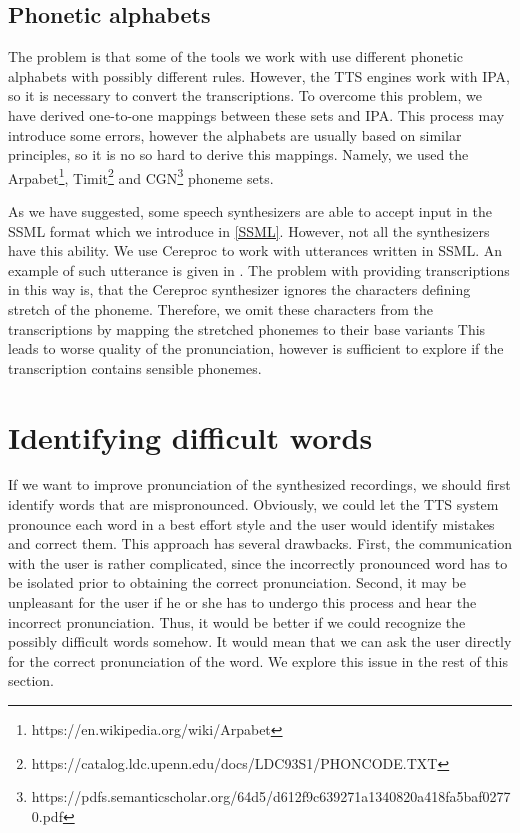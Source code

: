 \subsection{Phonetic alphabets}
\par
The problem is that some of the tools we work with use different phonetic alphabets with possibly different rules.
However, the TTS engines work with IPA, so it is necessary to convert the transcriptions.
To overcome this problem, we have derived one-to-one mappings between these sets and IPA.
This process may introduce some errors, however the alphabets are usually based on similar principles, so it is no so hard to derive this mappings.
Namely, we used the Arpabet\footnote{https://en.wikipedia.org/wiki/Arpabet}, Timit\footnote{https://catalog.ldc.upenn.edu/docs/LDC93S1/PHONCODE.TXT} and CGN\footnote{https://pdfs.semanticscholar.org/64d5/d612f9c639271a1340820a418fa5baf02770.pdf} phoneme sets.
\par
As we have suggested, some speech synthesizers are able to accept input in the SSML format which we introduce in \ref{SSML}.
However, not all the synthesizers have this ability.
We use Cereproc to work with utterances written in SSML.
An example of such utterance is given in .
The problem with providing transcriptions in this way is, that the Cereproc synthesizer ignores the characters defining stretch of the phoneme.
Therefore, we omit these characters from the transcriptions by mapping the stretched phonemes to their base variants
This leads to worse quality of the pronunciation, however is sufficient to explore if the transcription contains sensible phonemes.
\section{Identifying difficult words}
\label{ident-diff}
If we want to improve pronunciation of the synthesized recordings, we should first identify words that are mispronounced. Obviously, we could let the TTS system pronounce each word in a best effort style and  the user would identify mistakes and correct them. This approach has several drawbacks. First, the communication with the user is rather complicated, since the incorrectly pronounced word has to be isolated prior to obtaining the correct pronunciation.
Second, it may be unpleasant for the user if he or she has to undergo this process and hear the incorrect pronunciation. Thus, it would be better if we could recognize the possibly difficult words somehow. It would mean that we can ask the user directly for the correct pronunciation of the word. We explore this issue in the rest of this section.
